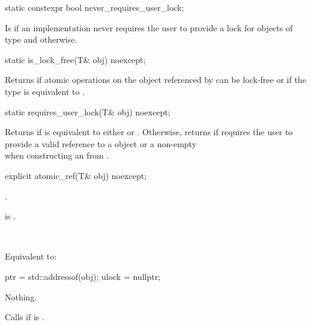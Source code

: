 \begin{addedblock}
\begin{itemdecl}
static constexpr bool never_requires_user_lock;
\end{itemdecl}

\begin{itemdescr}
\pnum
Is  if an implementation never requires the user to provide a 
lock for objects of type  and  otherwise.
\end{itemdescr}


\begin{itemdecl}
static is_lock_free(T& obj) noexcept;
\end{itemdecl}

\begin{itemdescr}
\returns Returns  if atomic operations on the object referenced by
 can be lock-free or if the  type is equivalent to 
.
\end{itemdescr}


\begin{itemdecl}
static requires_user_lock(T& obj) noexcept;
\end{itemdecl}

\begin{itemdescr}
\returns Returns  if  is equivalent to either
 or .
Otherwise, returns  if  requires the user to
provide a valid reference to a  object 
or a non-empty \\  
when constructing an  from . 
\end{itemdescr}
\end{addedblock}


\begin{itemdecl}
explicit atomic_ref(T& obj) noexcept;
\end{itemdecl}

\begin{itemdescr}
\pnum
{}.
\begin{addedblock}
\expects {} is .
\end{addedblock}

\pnum
\effects {}\\
\begin{addedblock}Equivalent to:
\begin{codeblock}
  ptr = std::addressof(obj);
  ulock = nullptr;
\end{codeblock}
\end{addedblock}

\pnum
\throws Nothing.
 
\pnum
\begin{addedblock}
\remarks Calls  if  is .
\end{addedblock}
\end{itemdescr}


